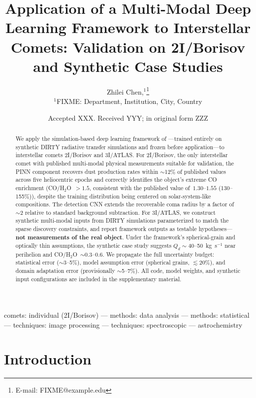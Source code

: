 \documentclass[usenatbib]{mnras}
\begin{document}
\title[DL Framework Applied to Interstellar Comets]{Application of a Multi-Modal Deep Learning Framework to Interstellar Comets: Validation on 2I/Borisov and Synthetic Case Studies}

\author[Chen et al.]{
Zhilei Chen,$^{1}$\thanks{E-mail: FIXME@example.edu}
\\
$^{1}$FIXME: Department, Institution, City, Country
}

\date{Accepted XXX. Received YYY; in original form ZZZ}

\begin{abstract}
We apply the simulation-based deep learning framework of \citet{paperI}---trained entirely on synthetic DIRTY radiative transfer simulations and frozen before application---to interstellar comets 2I/Borisov and 3I/ATLAS. For 2I/Borisov, the only interstellar comet with published multi-modal physical measurements suitable for validation, the PINN component recovers dust production rates within $\sim$12\% of published values across five heliocentric epochs and correctly identifies the object's extreme CO enrichment (CO/H$_2$O~$>1.5$, consistent with the published value of~$1.30$--$1.55$ (130--155\%)), despite the training distribution being centered on solar-system-like compositions. The detection CNN extends the recoverable coma radius by a factor of~$\sim$2 relative to standard background subtraction. For 3I/ATLAS, we construct synthetic multi-modal inputs from DIRTY simulations parameterized to match the sparse discovery constraints, and report framework outputs as testable hypotheses---\textbf{not measurements of the real object}. Under the framework's spherical-grain and optically thin assumptions, the synthetic case study suggests $Q_d\sim40$--50~kg~s$^{-1}$ near perihelion and CO/H$_2$O~$\sim0.3$--0.6. We propagate the full uncertainty budget: statistical error ($\sim$3--5\%), model assumption error (spherical grains, $\lesssim20\%$), and domain adaptation error (provisionally $\sim$5--7\%). All code, model weights, and synthetic input configurations are included in the supplementary material.
\end{abstract}

\begin{keywords}
comets: individual (2I/Borisov) --- methods: data analysis --- methods: statistical --- techniques: image processing --- techniques: spectroscopic --- astrochemistry
\end{keywords}

\section{Introduction}\label{sec:intro}
\end{document}
